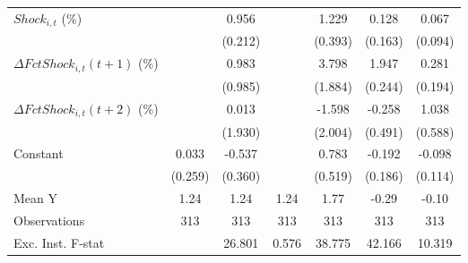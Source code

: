 {\begin{tabular}{l*{6}{c}}
\addlinespace
$ Shock_{i,t}$ (\%) &                     &       0.956\sym{***}&                     &       1.229\sym{***}&       0.128         &       0.067         \\
                    &                     &     (0.212)         &                     &     (0.393)         &     (0.163)         &     (0.094)         \\
\addlinespace
$ \Delta FctShock_{i,t}(t+1)$ (\%)&                     &       0.983         &                     &       3.798\sym{*}  &       1.947\sym{***}&       0.281         \\
                    &                     &     (0.985)         &                     &     (1.884)         &     (0.244)         &     (0.194)         \\
\addlinespace
$ \Delta FctShock_{i,t}(t+2)$ (\%)&                     &       0.013         &                     &      -1.598         &      -0.258         &       1.038\sym{*}  \\
                    &                     &     (1.930)         &                     &     (2.004)         &     (0.491)         &     (0.588)         \\
\addlinespace
Constant            &       0.033         &      -0.537         &                     &       0.783         &      -0.192         &      -0.098         \\
                    &     (0.259)         &     (0.360)         &                     &     (0.519)         &     (0.186)         &     (0.114)         \\
\midrule
Mean Y              &        1.24         &        1.24         &        1.24         &        1.77         &       -0.29         &       -0.10         \\
Observations        &         313         &         313         &         313         &         313         &         313         &         313         \\
Exc. Inst. F-stat   &                     &      26.801         &       0.576         &      38.775         &      42.166         &      10.319         \\
\bottomrule
\end{tabular}
}
